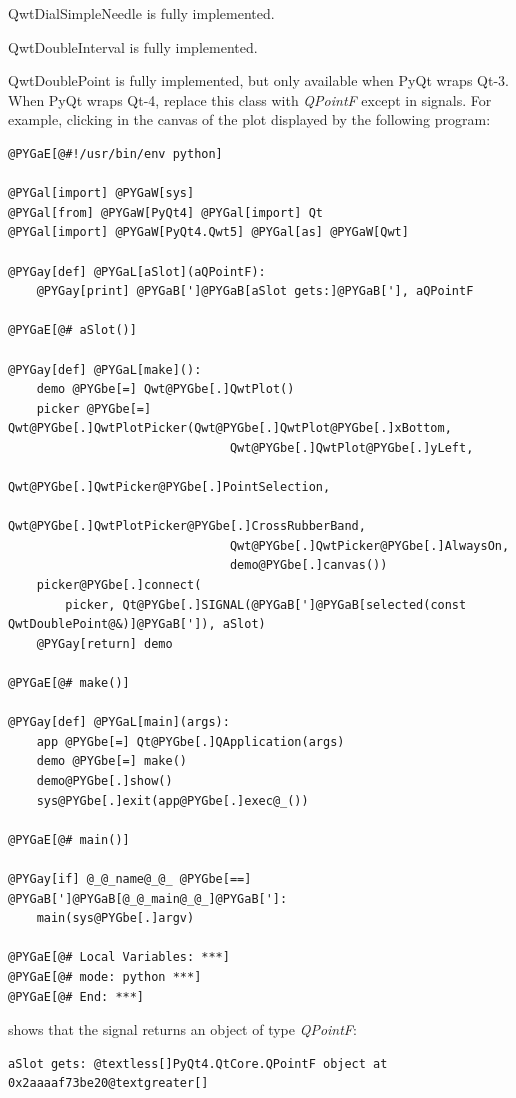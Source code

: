 \documentclass[a4paper,10pt,english]{manual}
\begin{document}
\hypertarget{PyQt4.Qwt5.QwtDialSimpleNeedle}{}\begin{classdesc}{QwtDialSimpleNeedle}{}
is fully implemented.
\end{classdesc}

\hypertarget{PyQt4.Qwt5.QwtDoubleInterval}{}\begin{classdesc}{QwtDoubleInterval}{}
is fully implemented.
\end{classdesc}

\hypertarget{PyQt4.Qwt5.QwtDoublePoint}{}\begin{classdesc}{QwtDoublePoint}{}
is fully implemented, but only available when PyQt wraps Qt-3.
When PyQt wraps Qt-4, replace this class with \emph{QPointF}
except in signals.
For example, clicking in the canvas of the plot displayed by the
following program:

\begin{Verbatim}[commandchars=@\[\]]
@PYGaE[@#!/usr/bin/env python]

@PYGal[import] @PYGaW[sys]
@PYGal[from] @PYGaW[PyQt4] @PYGal[import] Qt
@PYGal[import] @PYGaW[PyQt4.Qwt5] @PYGal[as] @PYGaW[Qwt]

@PYGay[def] @PYGaL[aSlot](aQPointF):
    @PYGay[print] @PYGaB[']@PYGaB[aSlot gets:]@PYGaB['], aQPointF

@PYGaE[@# aSlot()]

@PYGay[def] @PYGaL[make]():
    demo @PYGbe[=] Qwt@PYGbe[.]QwtPlot()
    picker @PYGbe[=] Qwt@PYGbe[.]QwtPlotPicker(Qwt@PYGbe[.]QwtPlot@PYGbe[.]xBottom,
                               Qwt@PYGbe[.]QwtPlot@PYGbe[.]yLeft,
                               Qwt@PYGbe[.]QwtPicker@PYGbe[.]PointSelection,
                               Qwt@PYGbe[.]QwtPlotPicker@PYGbe[.]CrossRubberBand,
                               Qwt@PYGbe[.]QwtPicker@PYGbe[.]AlwaysOn,
                               demo@PYGbe[.]canvas())
    picker@PYGbe[.]connect(
        picker, Qt@PYGbe[.]SIGNAL(@PYGaB[']@PYGaB[selected(const QwtDoublePoint@&)]@PYGaB[']), aSlot)
    @PYGay[return] demo

@PYGaE[@# make()]

@PYGay[def] @PYGaL[main](args):
    app @PYGbe[=] Qt@PYGbe[.]QApplication(args)
    demo @PYGbe[=] make()
    demo@PYGbe[.]show()
    sys@PYGbe[.]exit(app@PYGbe[.]exec@_())

@PYGaE[@# main()]

@PYGay[if] @_@_name@_@_ @PYGbe[==] @PYGaB[']@PYGaB[@_@_main@_@_]@PYGaB[']:
    main(sys@PYGbe[.]argv)

@PYGaE[@# Local Variables: ***]
@PYGaE[@# mode: python ***]
@PYGaE[@# End: ***]
\end{Verbatim}

shows that the signal returns an object of type \emph{QPointF}:

\begin{Verbatim}[commandchars=@\[\]]
aSlot gets: @textless[]PyQt4.QtCore.QPointF object at 0x2aaaaf73be20@textgreater[]
\end{Verbatim}
\end{classdesc}
\end{document}

